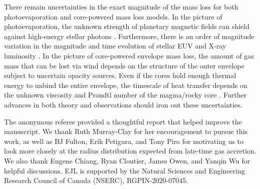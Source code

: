 \documentclass[twocolumn]{aastex63}
\begin{document}

There remain uncertainties in the exact magnitude of the mass loss for both photoevaporation and core-powered mass loss models. In the picture of photoevaporation, the unknown strength of planetary magnetic fields can shield against high-energy stellar photons \citep{Owen19}. Furthermore, there is an order of magnitude variation in the magnitude and time evolution of stellar EUV and X-ray luminosity \citep{Tu15}. In the picture of core-powered envelope mass loss, the amount of gas mass that can be lost via wind depends on the structure of the outer envelope subject to uncertain opacity sources. Even if the cores hold enough thermal energy to unbind the entire envelope, the timescale of heat transfer depends on the unknown viscosity and Prandtl number of the magma/rocky core \citep[e.g.,][]{Stamenkovic12,Garaud18,Fuentes20}. Further advances in both theory and observations should iron out these uncertainties. 

\acknowledgements
The anonymous referee provided a thoughtful report that helped improve the manuscript. We thank Ruth Murray-Clay for her encouragement to pursue this work, as well as BJ Fulton, Erik Petigura, and Tony Piro for motivating us to look more closely at the radius distribution expected from late-time gas accretion. We also thank Eugene Chiang, Ryan Cloutier, James Owen, and Yanqin Wu for helpful discussions. EJL is supported by the Natural Sciences and Engineering Research Council of Canada (NSERC), RGPIN-2020-07045.

{}

\end{document}
